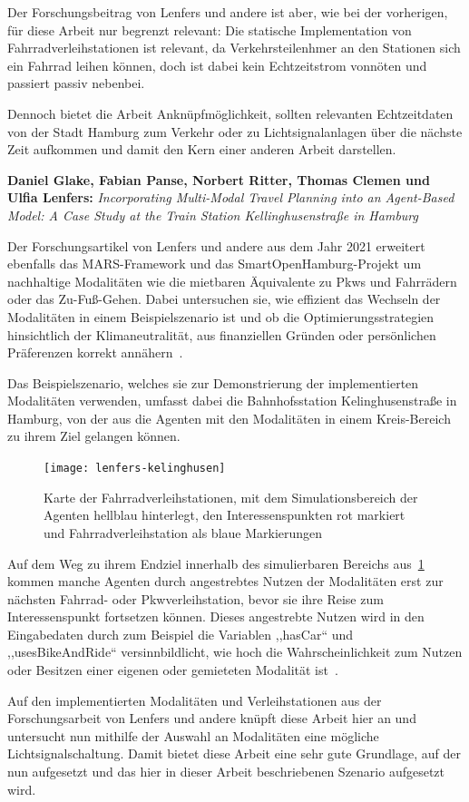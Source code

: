 Der Forschungsbeitrag von Lenfers und andere ist aber, wie bei der vorherigen, für diese Arbeit nur begrenzt relevant: Die statische Implementation von Fahrradverleihstationen ist relevant, da Verkehrsteilenhmer an den Stationen sich ein Fahrrad leihen können, doch ist dabei kein Echtzeitstrom vonnöten und passiert passiv nebenbei.

Dennoch bietet die Arbeit Anknüpfmöglichkeit, sollten relevanten Echtzeitdaten von der Stadt Hamburg zum Verkehr oder zu Lichtsignalanlagen über die nächste Zeit aufkommen und damit den Kern einer anderen Arbeit darstellen.


\textbf{Daniel Glake, Fabian Panse, Norbert Ritter, Thomas Clemen und Ulfia Lenfers:}
\textit{Incorporating Multi-Modal Travel Planning into an Agent-Based Model: A Case Study at the Train Station Kellinghusenstraße in Hamburg}

Der Forschungsartikel von Lenfers und andere aus dem Jahr 2021 erweitert ebenfalls das MARS-Framework und das SmartOpenHamburg-Projekt um nachhaltige Modalitäten wie die mietbaren Äquivalente zu Pkws und Fahrrädern oder das Zu-Fuß-Gehen.
Dabei untersuchen sie, wie effizient das Wechseln der Modalitäten in einem Beispielszenario ist und ob die Optimierungsstrategien hinsichtlich der Klimaneutralität, aus finanziellen Gründen oder persönlichen Präferenzen korrekt annähern~\cite{Lenfers-MMT-2021}.

Das Beispielszenario, welches sie zur Demonstrierung der implementierten Modalitäten verwenden, umfasst dabei die Bahnhofsstation Kelinghusenstraße in Hamburg, von der aus die Agenten mit den Modalitäten in einem Kreis-Bereich zu ihrem Ziel gelangen können.

\begin{figure}[h]
    \centering
    \texttt{[image: lenfers-kelinghusen]}~\caption{Karte der Fahrradverleihstationen, mit dem Simulationsbereich der Agenten hellblau hinterlegt, den Interessenspunkten rot markiert und Fahrradverleihstation als blaue Markierungen~\cite{Lenfers-MMT-2021}}
    \label{fig:lenfers-kelinghusen-area}
\end{figure}

Auf dem Weg zu ihrem Endziel innerhalb des simulierbaren Bereichs aus~\ref{fig:lenfers-kelinghusen-area} kommen manche Agenten durch angestrebtes Nutzen der Modalitäten erst zur nächsten Fahrrad- oder Pkwverleihstation, bevor sie ihre Reise zum Interessenspunkt fortsetzen können.
Dieses angestrebte Nutzen wird in den Eingabedaten durch zum Beispiel die Variablen ,,hasCar`` und ,,usesBikeAndRide`` versinnbildlicht, wie hoch die Wahrscheinlichkeit zum Nutzen oder Besitzen einer eigenen oder gemieteten Modalität ist~\cite{Lenfers-MMT-2021}.

Auf den implementierten Modalitäten und Verleihstationen aus der Forschungsarbeit von Lenfers und andere knüpft diese Arbeit hier an und untersucht nun mithilfe der Auswahl an Modalitäten eine mögliche Lichtsignalschaltung.
Damit bietet diese Arbeit eine sehr gute Grundlage, auf der nun aufgesetzt und das hier in dieser Arbeit beschriebenen Szenario aufgesetzt wird.
